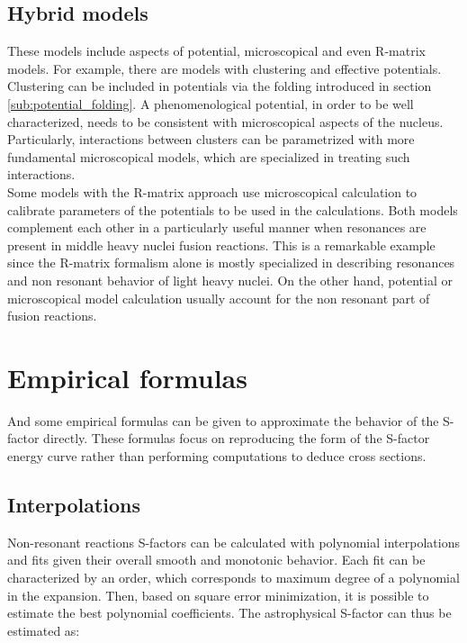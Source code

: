 \documentclass[openany]{book}
\begin{document}
\subsection{Hybrid models} \label{sub:special_hybrid}

These models include aspects of potential, microscopical and even R-matrix models. For example, there are models with clustering and effective potentials. \\

Clustering can be included in potentials via the folding introduced in section \ref{sub:potential_folding}. A phenomenological potential, in order to be well characterized, needs to be consistent with microscopical aspects of the nucleus.  Particularly, interactions between clusters can be parametrized with more fundamental microscopical models, which are specialized in treating such interactions. \\

Some models with the R-matrix approach use microscopical calculation to calibrate parameters of the potentials to be used in the calculations. Both models complement each other in a particularly useful manner when resonances are present in middle heavy nuclei fusion reactions. This is a remarkable example since the R-matrix formalism alone is mostly specialized in describing resonances and non resonant behavior of light heavy nuclei. On the other hand, potential or microscopical model calculation usually account for the non resonant part of fusion reactions. \\

\section{Empirical formulas} \label{sec:empiricalFormulas}

And some empirical formulas can be given to approximate the behavior of the S-factor directly. These formulas focus on reproducing the form of the S-factor energy curve rather than performing computations to deduce cross sections.

\subsection{Interpolations} \label{sub:empirical_interpolation}

Non-resonant reactions S-factors can be calculated with polynomial interpolations and fits given their overall smooth and monotonic behavior. Each fit can be characterized by an order, which corresponds to maximum degree of a polynomial in the expansion. Then, based on square error minimization, it is possible to estimate the best polynomial coefficients. The astrophysical S-factor can thus be estimated as:
\end{document}
